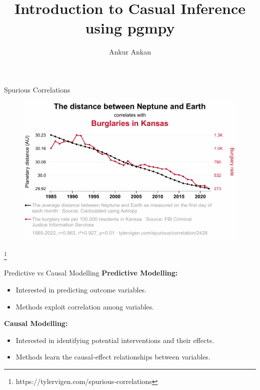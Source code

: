 \documentclass[aspectratio=169]{beamer}
\title[Causal Inference using pgmpy]{Introduction to Casual Inference using pgmpy}
\author{Ankur Ankan}
\institute[]{Postdoctoral Researcher \\ Radboud University, The Netherlands}
\date{}
\newcommand\blfootnote[1]{
    \begingroup
    \renewcommand\thefootnote{}\footnote{#1}
    \addtocounter{footnote}{-1}
    \endgroup
}
\begin{document}
\begin{frame}
	\maketitle
\end{frame}

\begin{frame}{Spurious Correlations}
	\begin{figure}
		\center
		\includegraphics[scale=0.63]{imgs/spurious1.pdf}
	\end{figure}
	\blfootnote{https://tylervigen.com/spurious-correlations}
\end{frame}

\begin{frame}{Predictive vs Causal Modelling}
	\textbf{Predictive Modelling:}
		\begin{itemize}
			\item Interested in predicting outcome variables.
			\item Methods exploit correlation among variables.
		\end{itemize}
	\vspace{2em}
	\textbf{Causal Modelling:}
		\begin{itemize}
			\item Interested in identifying potential interventions and their effects.
			\item Methods learn the causal-effect relationships between variables.
		\end{itemize}
\end{frame}


\end{document}
